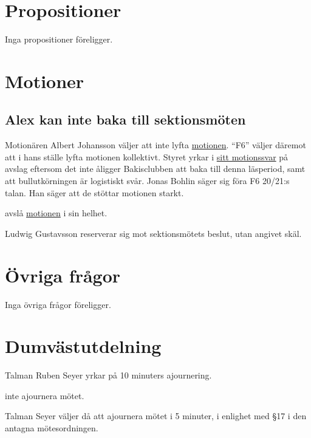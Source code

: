 \documentclass[hidelinks]{../sektionsmote} %
\begin{document}
\section{Propositioner}
Inga propositioner föreligger.

\section{Motioner}

\subsection{Alex kan inte baka till sektionsmöten}
Motionären Albert Johansson väljer att inte lyfta \hyperlink{bilagor/motion/a.pdf.1}{motionen}.
\enquote{F6} väljer däremot att i hans ställe lyfta motionen kollektivt.
Styret yrkar i \hyperlink{bilagor/motion/a-svar.pdf.1}{sitt motionssvar} på avslag eftersom det inte åligger Bakisclubben att baka till denna läsperiod, samt att bullutkörningen är logistiskt svår.
Jonas Bohlin säger sig föra F6 20/21:s talan.
Han säger att de stöttar motionen starkt.
\begin{beslut}
    \item avslå \hyperlink{bilagor/motion/a.pdf.1}{motionen} i sin helhet.
\end{beslut}
Ludwig Gustavsson reserverar sig mot sektionsmötets beslut, utan angivet skäl.

\section{Övriga frågor}
Inga övriga frågor föreligger.

\section{Dumvästutdelning}
\begin{ofraga}
    Talman Ruben Seyer yrkar på 10 minuters ajournering.
    \begin{beslut}
        \item inte ajournera mötet.
    \end{beslut}
    Talman Seyer väljer då att ajournera mötet i 5 minuter, i enlighet med §17 i den antagna mötesordningen.
\end{ofraga}
\end{document}
